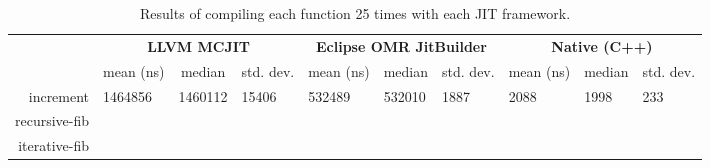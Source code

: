 \begin{table*}[t]
  \begin{tabular}{|r|l|l|l|l||l|l|l|l|l|}
  \hline
  \multicolumn{1}{|l|}{\multirow{2}{*}{}} & \multicolumn{3}{c|}{\textbf{LLVM MCJIT}}                                                                                     & \multicolumn{3}{c|}{\textbf{Eclipse OMR JitBuilder}}                                                                & \multicolumn{3}{c|}{\textbf{Native (C++)}}                                                                               \\ \cline{2-10}
  \multicolumn{1}{|c|}{\textbf{Program}}  & \multicolumn{1}{c|}{mean (ns)}           & \multicolumn{1}{c|}{median}  & \multicolumn{1}{c|}{std. dev.}                     & \multicolumn{1}{c|}{mean (ns)}           & \multicolumn{1}{c|}{median}  & \multicolumn{1}{c|}{std. dev.}            & \multicolumn{1}{c|}{mean (ns)}  & \multicolumn{1}{c|}{median}  & \multicolumn{1}{c|}{std. dev.}                        \\ \hline
  increment                               & \num{1464856}                            & \num{1460112}                & \num{15406}                                        & \num{532489}                             & \num{532010}                 & \num{1887}                                & \num{2088}                              & \num{1998}                   & \num{233}                                \\ \hline
  recursive-fib                           & \num{}                                   & \num{}                       & \num{}                                             & \num{}                                   & \num{}                       & \num{}                                    & \num{}                                  & \num{}                       & \num{}                                \\ \hline
  iterative-fib                           & \num{}                                   & \num{}                       & \num{}                                             & \num{}                                   & \num{}                       & \num{}                                    & \num{}                                  & \num{}                       & \num{}                                \\ \hline
  \end{tabular}
  \caption{Results of compiling each function 25 times with each JIT framework.}
  \label{tab:1k_time}
\end{table*}
